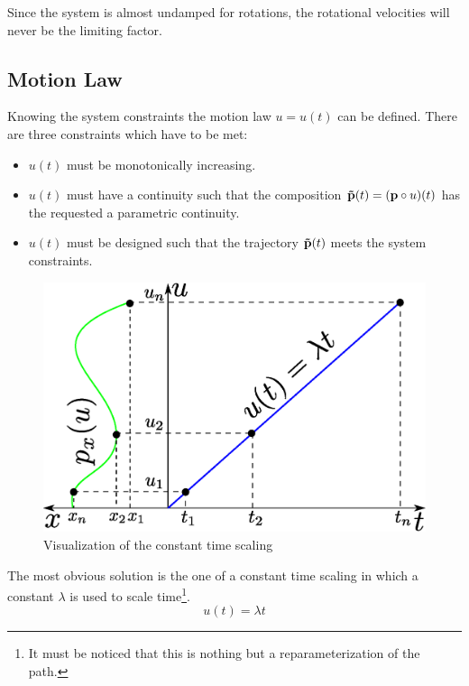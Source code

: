 Since the system is almost undamped for rotations, the rotational velocities will never be the limiting factor.

\subsection{Motion Law}
\label{subsec:motionLaw}
Knowing the system constraints the motion law $u=u(t)$ can be defined. There are three constraints which have to be met:

\begin{itemize}
\item $u(t)$ must be monotonically increasing.
\item $u(t)$ must have a  continuity such that the composition ${\bf \tilde{p}}(t)=({\bf p}\circ u)(t)$ has the requested a parametric continuity.
\item $u(t)$ must be designed such that the trajectory ${\bf \tilde{p}}(t)$ meets the system constraints.
\end{itemize}

\begin{figure}[H]
  \begin{minipage}[t]{0.6\textwidth}
    \includegraphics[width = \textwidth]{graphics/constantTimeScaling.eps}
  \end{minipage}
  \caption{Visualization of the constant time scaling}
  \label{fig:constantTimeScaling}
\end{figure}


The most obvious solution is the one of a constant time scaling in which a constant $\lambda$ is used to scale time\footnote{It must be noticed that this is nothing but a reparameterization of the path.}.
\begin{equation}
u(t) = \lambda t
\end{equation}

